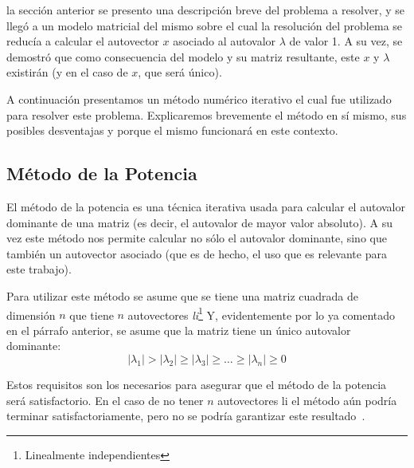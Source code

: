 \par {} la secci\'on anterior se presento una descripci\'on
breve del problema a resolver, y se lleg\'o a un modelo matricial del mismo
sobre el cual la resoluci\'on del problema se reduc\'ia a calcular el autovector
$x$ asociado al autovalor $\lambda$ de valor 1. A su vez, se demostr\'o que como
consecuencia del modelo y su matriz resultante, este $x$ y $\lambda$ existir\'an
(y en el caso de $x$, que ser\'a \'unico).

\par A continuaci\'on presentamos un m\'etodo num\'erico iterativo el cual fue
utilizado para resolver este problema. Explicaremos brevemente el m\'etodo en sí
mismo, sus posibles desventajas y porque el mismo funcionar\'a en este contexto.

\subsection{M\'etodo de la Potencia}
\par El m\'etodo de la potencia es una t\'ecnica iterativa usada para calcular
el autovalor dominante de una matriz (es decir, el autovalor de mayor valor
absoluto). A su vez este m\'etodo nos permite calcular no s\'olo el autovalor
dominante, sino que tambi\'en un autovector asociado (que es de hecho, el uso que
es relevante para este trabajo).

\par Para utilizar este m\'etodo se asume que se tiene una matriz cuadrada de
dimensi\'on $n$ que tiene $n$ autovectores \emph{li}\footnote{Linealmente
independientes} Y, evidentemente por lo ya comentado en el p\'arrafo anterior,
se asume que la matriz tiene un \'unico autovalor dominante:
\begin{equation*}
    |\lambda_1|>|\lambda_2|\geq|\lambda_3|\geq\dots\geq|\lambda_n|\geq 0
\end{equation*}

\par Estos requisitos son los necesarios para asegurar que el m\'etodo de la
potencia ser\'a satisfactorio. En el caso de no tener $n$ autovectores li el
m\'etodo a\'un podr\'ia terminar satisfactoriamente, pero no se podr\'ia
garantizar este resultado~\cite[p.576]{Burden2010}.

